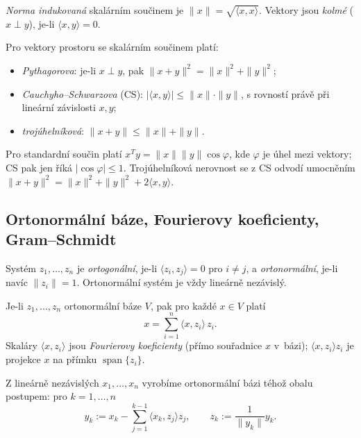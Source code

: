 \documentclass[11pt,a4paper]{article}
\newcommand{\spn}{\operatorname{span}}
\begin{document}
\begin{definice}
\emph{Norma indukovaná} skalárním součinem je $\|x\|=\sqrt{\langle x,x\rangle}$. Vektory jsou \emph{kolmé} ($x\perp y$), je-li $\langle x,y\rangle=0$.
\end{definice}

\begin{veta}
Pro vektory prostoru se skalárním součinem platí:
\begin{itemize}
  \item \emph{Pythagorova}: je-li $x\perp y$, pak $\|x+y\|^2=\|x\|^2+\|y\|^2$;
  \item \emph{Cauchyho--Schwarzova} (CS): $|\langle x,y\rangle|\le\|x\|\cdot\|y\|$, s rovností právě při lineární závislosti $x,y$;
  \item \emph{trojúhelníková}: $\|x+y\|\le\|x\|+\|y\|$.
\end{itemize}
\end{veta}

\begin{intuice}
Pro standardní součin platí $x^Ty=\|x\|\|y\|\cos\varphi$, kde $\varphi$ je úhel mezi vektory; CS pak jen říká $|\cos\varphi|\le1$. Trojúhelníková nerovnost se z CS odvodí umocněním $\|x+y\|^2=\|x\|^2+\|y\|^2+2\langle x,y\rangle$.
\end{intuice}

\subsection{Ortonormální báze, Fourierovy koeficienty, Gram--Schmidt}

\begin{definice}
Systém $z_1,\dots,z_n$ je \emph{ortogonální}, je-li $\langle z_i,z_j\rangle=0$ pro $i\neq j$, a \emph{ortonormální}, je-li navíc $\|z_i\|=1$. Ortonormální systém je vždy lineárně nezávislý.
\end{definice}

\begin{veta}
Je-li $z_1,\dots,z_n$ ortonormální báze $V$, pak pro každé $x\in V$ platí
\[
  x=\sum_{i=1}^n\langle x,z_i\rangle\,z_i.
\]
Skaláry $\langle x,z_i\rangle$ jsou \emph{Fourierovy koeficienty} (přímo souřadnice $x$ v~bázi); $\langle x,z_i\rangle z_i$ je projekce $x$ na přímku $\spn\{z_i\}$.
\end{veta}

\begin{veta}
Z lineárně nezávislých $x_1,\dots,x_n$ vyrobíme ortonormální bázi téhož obalu postupem: pro $k=1,\dots,n$
\[
  y_k:=x_k-\sum_{j=1}^{k-1}\langle x_k,z_j\rangle z_j,\qquad z_k:=\frac{1}{\|y_k\|}y_k.
\]
\end{veta}
\end{document}
